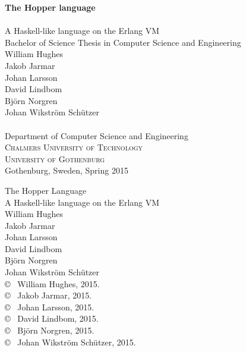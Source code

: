 \begin{titlepage}
			
\addtolength{\voffset}{2cm}

\mbox{}
\vfill
\renewcommand{\familydefault}{\sfdefault} \normalfont %
\textbf{{\Huge	The Hopper language 	\\[0.2cm] 
				}} 	\\[0.5cm]
{\Large A Haskell-like language on the Erlang VM}\\[0.5cm]
Bachelor of Science Thesis in Computer Science and Engineering \\[0.5cm]

{\Large
  William Hughes \\
  Jakob Jarmar   \\
  Johan Larsson \\
  David Lindbom \\
  Björn Norgren \\
  Johan Wikström Schützer \\
  }\\[2.0cm]


Department of Computer Science and Engineering \\
\textsc{Chalmers University of Technology} \\
\textsc{University of Gothenburg} \\
Gothenburg, Sweden, Spring 2015

\renewcommand{\familydefault}{\rmdefault} \normalfont
\end{titlepage}

\newpage
\restoregeometry
\thispagestyle{empty}
\mbox{}

\newpage
\thispagestyle{plain}
\vspace*{4.5cm}
The Hopper Language\\
A Haskell-like language on the Erlang VM\\
William Hughes \\
Jakob Jarmar   \\
Johan Larsson \\
David Lindbom \\
Björn Norgren \\
Johan Wikström Schützer \\[0.5cm]

\copyright ~ William Hughes, 2015.\\
\copyright ~ Jakob Jarmar, 2015.\\
\copyright ~ Johan Larsson, 2015.\\
\copyright ~ David Lindbom, 2015.\\
\copyright ~ Björn Norgren, 2015.\\
\copyright ~ Johan Wikström Schützer, 2015.\\[0.5cm]

